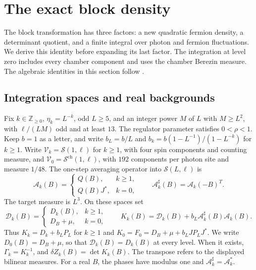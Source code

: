 \documentclass[11pt,letterpaper,reqno]{amsart}
\newcommand{\Z}{\mathbb Z}
\newcommand{\Sspace}{\mathcal S}
\begin{document}
\section{The exact block density}\label{sec:rg-step}

The block transformation has three factors: a new quadratic
fermion density, a determinant quotient, and a finite integral
over photon and fermion fluctuations. We derive this identity
before expanding its last factor. The integration at level
zero includes every chamber component and uses the chamber
Berezin measure. The algebraic identities in this section follow
\cite[\S13.1--13.3]{QED3Master}.

\subsection{Integration spaces and real backgrounds}
\label{subsec:rg-step-real-background}

Fix $k\in\Z_{\ge0}$, $\eta_k=L^{-k}$, odd $L\ge5$, and an
integer power $M$ of $L$ with $M\ge L^2$, with $\ell/(LM)$ odd and at least $13$.
The regulator parameter satisfies $0<\rho<1$.
Keep $b=1$ as a letter, and write
$b_L=b/L$ and
$b_k=b(1-L^{-1})/(1-L^{-k})$ for $k\ge1$.
Write $\mathscr V_k=\Sspace(1,\ell)$ for $k\ge1$, with
four spin components and counting measure, and
$\mathscr V_0=\Sspace^{\mathrm{ch}}(1,\ell)$, with
$192$ components per photon site and measure $1/48$.
The one-step averaging operator into $\Sspace(L,\ell)$ is
\[
 \mathcal A_k(B)=
 \begin{cases}
 Q(B),&k\ge1,\\
 Q(B)J^*,&k=0,
 \end{cases}
 \qquad
 \mathcal A_k^\sharp(B)=\mathcal A_k(-B)^T.
\]
The target measure is $L^3$. On these spaces set
\begin{equation}\label{eq:rg-step-quadratic-operators}
 \mathcal D_k(B)=
 \begin{cases}D_k(B),&k\ge1,\\D_B+\mu,&k=0,\end{cases}
 \qquad
 K_k(B)=\mathcal D_k(B)+b_L\mathcal A_k^\sharp(B)\mathcal A_k(B).
\end{equation}
Thus $K_k=D_k+b_LP_L$ for $k\ge1$ and
$K_0=F_0=D_B+\mu+b_LJP_LJ^*$.
We write $D_0(B)=D_B+\mu$, so that
$\mathcal D_k(B)=D_k(B)$ at every level.
When it exists, $\Gamma_k=K_k^{-1}$, and
$\delta Z_k(B)=\det K_k(B)$.
The transpose refers to the displayed bilinear measures.
For a real $B$, the phases have modulus one and
$\mathcal A_k^\sharp=\mathcal A_k^*$.
\end{document}
